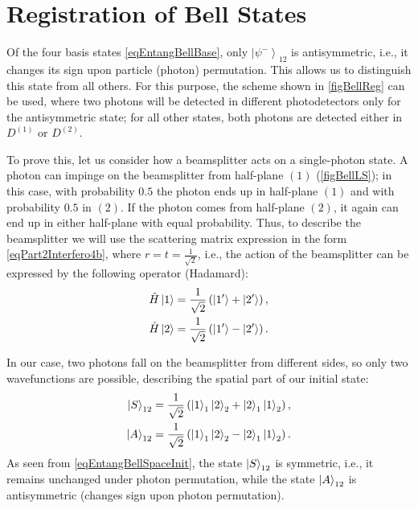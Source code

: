 \section{Registration of Bell States}
\label{pPart3EntangleBellReg}
Of the four basis states \eqref{eqEntangBellBase}, only 
$\left|\psi^{-}\right>_{12}$ is antisymmetric, i.e., it changes
its sign upon particle (photon) permutation. This allows us to
distinguish this state from all others. For this purpose, the scheme
shown in \autoref{figBellReg} can be used, where two photons
will be detected in different photodetectors only for the
antisymmetric state; for all other states, both photons are detected
either in $D^{(1)}$ or $D^{(2)}$.


 
To prove this, let us consider how a beamsplitter acts on a single-photon
state. A photon can impinge on the beamsplitter from half-plane
$\left(1\right)$ (\autoref{figBellLS}); in this case, with probability
$0.5$ the photon ends up in half-plane $\left(1\right)$ and with probability
$0.5$ in $\left(2\right)$. If the photon comes from half-plane
$\left(2\right)$, it again can end up in either half-plane with equal probability. 
Thus, to describe the beamsplitter we will use the scattering matrix
expression in the form \eqref{eqPart2Interfero4b}, where
$r=t=\frac{1}{\sqrt{2}}$, i.e., the action of the beamsplitter can be
expressed by the following operator 
(Hadamard\cite{bPhisQuantInfo}):
\begin{eqnarray}
\hat{H} \ket{1} = \frac{1}{\sqrt{2}}
\left(\ket{1'} +
\ket{2'}\right),
\nonumber \\
\hat{H} \ket{2} = \frac{1}{\sqrt{2}}\left(\ket{1'} -
\ket{2'}\right).
\label{eqEntangBellHadamar}
\end{eqnarray}

In our case, two photons fall on the beamsplitter from different sides,
so only two wavefunctions are possible, describing the spatial part of
our initial state:
\begin{eqnarray}
\ket{S}_{12} = \frac{1}{\sqrt{2}}\left(
\ket{1}_1\ket{2}_2 +
\ket{2}_1\ket{1}_2\right),
\nonumber \\
\ket{A}_{12} = \frac{1}{\sqrt{2}}\left(
\ket{1}_1\ket{2}_2 -
\ket{2}_1\ket{1}_2\right).
\label{eqEntangBellSpaceInit}
\end{eqnarray}
As seen from \eqref{eqEntangBellSpaceInit}, the state $\ket{S}_{12}$
is symmetric, i.e., it remains unchanged under photon permutation, while
the state $\ket{A}_{12}$ is antisymmetric (changes sign upon photon permutation).

